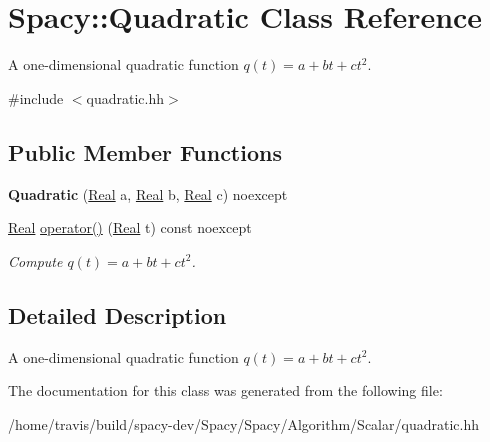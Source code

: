 \hypertarget{classSpacy_1_1Quadratic}{\section{\-Spacy\-:\-:\-Quadratic \-Class \-Reference}
\label{classSpacy_1_1Quadratic}
}


\-A one-\/dimensional quadratic function $q(t) = a + bt + ct^2$.  




{\ttfamily \#include $<$quadratic.\-hh$>$}

\subsection*{\-Public \-Member \-Functions}
\begin{DoxyCompactItemize}
\item 
\hypertarget{classSpacy_1_1Quadratic_a95858d6af14cbe5f902437107494c3c3}{{\bfseries \-Quadratic} (\hyperlink{classSpacy_1_1Real}{\-Real} a, \hyperlink{classSpacy_1_1Real}{\-Real} b, \hyperlink{classSpacy_1_1Real}{\-Real} c) noexcept}\label{classSpacy_1_1Quadratic_a95858d6af14cbe5f902437107494c3c3}

\item 
\hypertarget{classSpacy_1_1Quadratic_a4535530da8109aa29a5ca701c3fb0710}{\hyperlink{classSpacy_1_1Real}{\-Real} \hyperlink{classSpacy_1_1Quadratic_a4535530da8109aa29a5ca701c3fb0710}{operator()} (\hyperlink{classSpacy_1_1Real}{\-Real} t) const noexcept}\label{classSpacy_1_1Quadratic_a4535530da8109aa29a5ca701c3fb0710}

\begin{DoxyCompactList}\small\item\em \-Compute $q(t) = a + bt + ct^2 $. \end{DoxyCompactList}\end{DoxyCompactItemize}


\subsection{\-Detailed \-Description}
\-A one-\/dimensional quadratic function $q(t) = a + bt + ct^2$. 

\-The documentation for this class was generated from the following file\-:\begin{DoxyCompactItemize}
\item 
/home/travis/build/spacy-\/dev/\-Spacy/\-Spacy/\-Algorithm/\-Scalar/quadratic.\-hh\end{DoxyCompactItemize}
